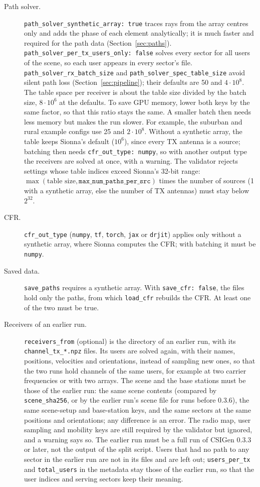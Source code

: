 \documentclass{article}
\newcommand{\key}[1]{\texttt{#1}}
\begin{document}
\begin{description}
  \item[Path solver.] \key{path\_solver\_synthetic\_array: true} traces rays from the array centres only and adds the phase of each element analytically; it is much faster and required for the path data (Section~\ref{sec:paths}). \key{path\_solver\_per\_tx\_users\_only: false} solves every sector for all users of the scene, so each user appears in every sector's file. \key{path\_solver\_rx\_batch\_size} and \key{path\_solver\_spec\_table\_size} avoid silent path loss (Section~\ref{sec:pipeline}); their defaults are 50 and $4 \cdot 10^8$. The table space per receiver is about the table size divided by the batch size, $8 \cdot 10^6$ at the defaults. To save GPU memory, lower both keys by the same factor, so that this ratio stays the same. A smaller batch then needs less memory but makes the run slower. For example, the suburban and rural example configs use 25 and $2 \cdot 10^8$. Without a synthetic array, the table keeps Sionna's default ($10^6$), since every TX antenna is a source; batching then needs \key{cfr\_out\_type: numpy}, so with another output type the receivers are solved at once, with a warning. The validator rejects settings whose table indices exceed Sionna's 32-bit range: $\max(\textrm{table size}, \texttt{max\_num\_paths\_per\_src})$ times the number of sources (1 with a synthetic array, else the number of TX antennas) must stay below $2^{32}$.
  \item[CFR.] \key{cfr\_out\_type} (\texttt{numpy}, \texttt{tf}, \texttt{torch}, \texttt{jax} or \texttt{drjit}) applies only without a synthetic array, where Sionna computes the CFR; with batching it must be \texttt{numpy}.
  \item[Saved data.] \key{save\_paths} requires a synthetic array. With \key{save\_cfr: false}, the files hold only the paths, from which \texttt{load\_cfr} rebuilds the CFR. At least one of the two must be true.
  \item[Receivers of an earlier run.] \key{receivers\_from} (optional) is the directory of an earlier run, with its \texttt{channel\_tx\_*.npz} files. Its users are solved again, with their names, positions, velocities and orientations, instead of sampling new ones, so that the two runs hold channels of the same users, for example at two carrier frequencies or with two arrays. The scene and the base stations must be those of the earlier run: the same scene contents (compared by \texttt{scene\_sha256}, or by the earlier run's scene file for runs before 0.3.6), the same scene-setup and base-station keys, and the same sectors at the same positions and orientations; any difference is an error. The radio map, user sampling and mobility keys are still required by the validator but ignored, and a warning says so. The earlier run must be a full run of CSIGen 0.3.3 or later, not the output of the split script. Users that had no path to any sector in the earlier run are not in its files and are left out; \texttt{users\_per\_tx} and \texttt{total\_users} in the metadata stay those of the earlier run, so that the user indices and serving sectors keep their meaning.
\end{description}
\end{document}
